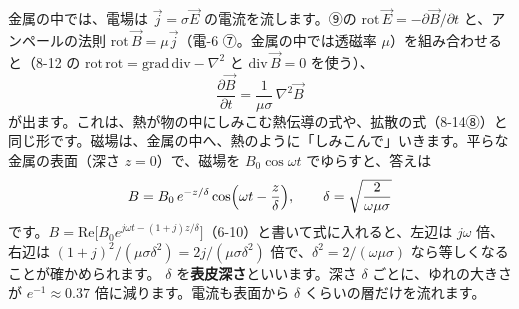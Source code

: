 金属の中では、電場は $\vec j=\sigma\vec E$ の電流を流します。⑨の $\mathrm{rot}\,\vec E=-\partial\vec B/\partial t$ と、アンペールの法則 $\mathrm{rot}\,\vec B=\mu\vec j$（電-6 ⑦。金属の中では透磁率 $\mu$）を組み合わせると（8-12 の $\mathrm{rot}\,\mathrm{rot}=\mathrm{grad}\,\mathrm{div}-\nabla^2$ と $\mathrm{div}\,\vec B=0$ を使う）、
\[ \frac{\partial\vec B}{\partial t}=\frac{1}{\mu\sigma}\,\nabla^2\vec B \]
が出ます。これは、熱が物の中にしみこむ熱伝導の式や、拡散の式（8-14⑧）と同じ形です。磁場は、金属の中へ、熱のように「しみこんで」いきます。平らな金属の表面（深さ $z=0$）で、磁場を $B_0\cos\omega t$ でゆらすと、答えは
\[ B=B_0\,e^{-z/\delta}\cos\Bigl(\omega t-\frac{z}{\delta}\Bigr),\qquad \delta=\sqrt{\frac{2}{\omega\mu\sigma}} \]
です。$B=\mathrm{Re}\bigl[B_0e^{j\omega t-(1+j)z/\delta}\bigr]$（6-10）と書いて式に入れると、左辺は $j\omega$ 倍、右辺は $(1+j)^2/(\mu\sigma\delta^2)=2j/(\mu\sigma\delta^2)$ 倍で、$\delta^2=2/(\omega\mu\sigma)$ なら等しくなることが確かめられます。
\label{ph:電-8:delta}$\delta$ を\textbf{表皮深さ}といいます。深さ $\delta$ ごとに、ゆれの大きさが $e^{-1}\approx0.37$ 倍に減ります。電流も表面から $\delta$ くらいの層だけを流れます。

